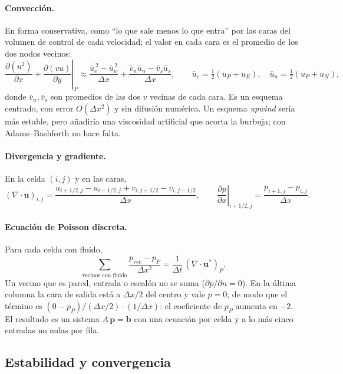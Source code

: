 \documentclass[11pt,letterpaper]{article}
\newcommand{\vu}{\mathbf{u}}
\begin{document}
\paragraph{Convección.} En forma conservativa, como ``lo que sale menos lo que entra'' por las caras del volumen de
control de cada velocidad; el valor en cada cara es el promedio de los dos nodos vecinos:
\begin{equation}
\left.\frac{\partial(u^2)}{\partial x}+\frac{\partial(vu)}{\partial y}\right|_P\approx
\frac{\bar u_e^{\,2}-\bar u_w^{\,2}}{\Delta x}+\frac{\bar v_n\bar u_n-\bar v_s\bar u_s}{\Delta x},\qquad
\bar u_e=\tfrac12(u_P+u_E),\quad \bar u_n=\tfrac12(u_P+u_N),
\end{equation}
donde $\bar v_n,\bar v_s$ son promedios de las dos $v$ vecinas de cada cara. Es un esquema centrado, con error
$O(\Delta x^2)$ y sin difusión numérica. Un esquema \emph{upwind} sería más estable, pero añadiría una viscosidad
artificial que acorta la burbuja; con Adams–Bashforth no hace falta.

\paragraph{Divergencia y gradiente.} En la celda $(i,j)$ y en las caras,
\begin{equation}
(\nabla\cdot\vu)_{i,j}=\frac{u_{i+1/2,j}-u_{i-1/2,j}+v_{i,j+1/2}-v_{i,j-1/2}}{\Delta x},\qquad
\left.\frac{\partial p}{\partial x}\right|_{i+1/2,j}=\frac{p_{i+1,j}-p_{i,j}}{\Delta x}.
\end{equation}

\paragraph{Ecuación de Poisson discreta.} Para cada celda con fluido,
\begin{equation}
\sum_{\text{vecinos con fluido}}\frac{p_{\text{vec}}-p_P}{\Delta x^2}=\frac{1}{\Delta t}\,(\nabla\cdot\vu^*)_P .
\end{equation}
Un vecino que es pared, entrada o escalón no se suma ($\partial p/\partial n=0$). En la última columna la cara de salida
está a $\Delta x/2$ del centro y vale $p=0$, de modo que el término es $(0-p_P)/(\Delta x/2)\cdot(1/\Delta x)$: el
coeficiente de $p_P$ aumenta en $-2$. El resultado es un sistema $A\,\mathbf p=\mathbf b$ con una ecuación por celda y
a lo más cinco entradas no nulas por fila.

\subsection{Estabilidad y convergencia}
\end{document}
